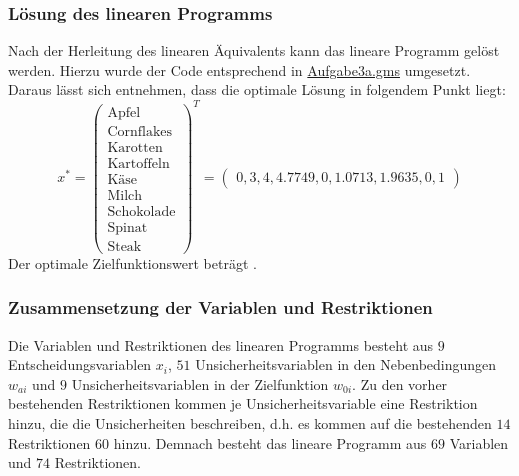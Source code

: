 \documentclass[a4paper,12pt]{article}
\begin{document}
\newpage

\subsubsection*{L\"osung des linearen Programms}

Nach der Herleitung des linearen \"Aquivalents kann das lineare Programm gel\"ost werden. Hierzu wurde der Code entsprechend in \href{../src/r3/Aufgabe3a.gms}{Aufgabe3a.gms} umgesetzt.
Daraus l\"asst sich entnehmen, dass die optimale L\"osung in folgendem Punkt liegt:
\[
x^* = \begin{pmatrix}
    \text{Apfel} \\ \text{Cornflakes} \\ \text{Karotten} \\ \text{Kartoffeln} \\ \text{K\"ase} \\ \text{Milch} \\ \text{Schokolade} \\ \text{Spinat} \\ \text{Steak}
    \end{pmatrix}^T
     =
     \begin{pmatrix}
     0, 3, 4, 4.7749, 0, 1.0713, 1.9635, 0, 1
        \end{pmatrix}
\]
Der optimale Zielfunktionswert betr\"agt .

\subsubsection*{Zusammensetzung der Variablen und Restriktionen} 

Die Variablen und Restriktionen des linearen Programms besteht aus $9$ Entscheidungsvariablen $x_i$, $51$ Unsicherheitsvariablen in den Nebenbedingungen $w_{ai}$ und $9$ Unsicherheitsvariablen in der Zielfunktion $w_{0i}$.
Zu den vorher bestehenden Restriktionen kommen je Unsicherheitsvariable eine Restriktion hinzu, die die Unsicherheiten beschreiben, d.h. es kommen auf die bestehenden $14$ Restriktionen $60$ hinzu.
Demnach besteht das lineare Programm aus $69$ Variablen und $74$ Restriktionen.

\newpage
\end{document}
